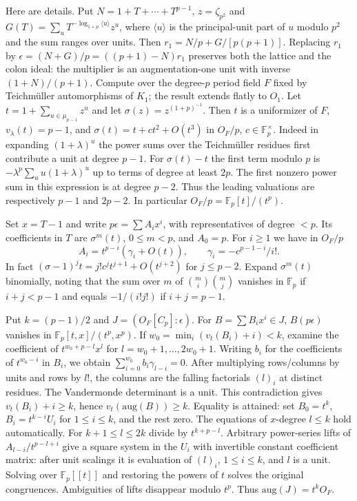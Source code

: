 \documentclass[11pt]{article}
\begin{document}
Here are details. Put $N=1+T+\cdots+T^{p-1}$, $z=\zeta_{p^2}$ and
$G(T)=\sum_u T^{-\log_{1+p}\langle u\rangle}z^u$, where $\langle u\rangle$
is the principal-unit part of $u$ modulo $p^2$ and the sum ranges over
units. Then $r_1=N/p+G/[p(p+1)]$. Replacing $r_1$ by
$\epsilon=(N+G)/p=((p+1)-N)r_1$ preserves both the lattice and the
colon ideal: the multiplier is an augmentation-one unit with inverse
$(1+N)/(p+1)$. Compute over the degree-$p$ period field $F$ fixed by
Teichm\"uller automorphisms of $K_1$; the result extends flatly to $O_1$.
Let $t=1+\sum_{u\in\mu_{p-1}}z^u$ and let $\sigma(z)=z^{(1+p)^{-1}}$.
Then $t$ is a uniformizer of $F$, $v_\lambda(t)=p-1$, and
$\sigma(t)=t+ct^2+O(t^3)$ in $O_F/p$, $c\in\mathbb F_p^\times$.
Indeed in expanding $(1+\lambda)^u$ the power sums over the
Teichm\"uller residues first contribute a unit at degree $p-1$. For
$\sigma(t)-t$ the first term modulo $p$ is
$-\lambda^p\sum_u u(1+\lambda)^u$ up to terms of degree at least $2p$.
The first nonzero power sum in this expression is at degree $p-2$.
Thus the leading valuations are respectively $p-1$ and $2p-2$.
In particular $O_F/p=\mathbb F_p[t]/(t^p)$.

Set $x=T-1$ and write $p\epsilon=\sum A_i x^i$, with representatives
of degree $<p$. Its coefficients in $T$ are $\sigma^m(t)$,
$0\le m<p$, and $A_0=p$. For $i\ge1$ we have in $O_F/p$
\[
 A_i=t^{p-i}(\gamma_i+O(t)),\qquad \gamma_i=-c^{p-1-i}/i!.
\]
In fact $(\sigma-1)^jt=j!c^jt^{j+1}+O(t^{j+2})$ for $j\le p-2$.
Expand $\sigma^m(t)$ binomially, noting that the sum over $m$ of
$\binom mi\binom mj$ vanishes in $\mathbb F_p$ if $i+j<p-1$ and equals
$-1/(i!j!)$ if $i+j=p-1$.

Put $k=(p-1)/2$ and $J=(O_F[C_p]:\epsilon)$. For $B=\sum B_ix^i\in J$,
$B(p\epsilon)$ vanishes in $\mathbb F_p[t,x]/(t^p,x^p)$.
If $w_0=\min_i(v_t(B_i)+i)<k$, examine the coefficient of
$t^{w_0+p-l}x^l$ for $l=w_0+1,\ldots,2w_0+1$. Writing $b_i$ for
the coefficients of $t^{w_0-i}$ in $B_i$, we obtain
$\sum_{i=0}^{w_0} b_i\gamma_{l-i}=0$. After multiplying rows/columns
by units and rows by $l!$, the columns are the falling factorials
$(l)_i$ at distinct residues. The Vandermonde determinant is a unit.
This contradiction gives $v_t(B_i)+i\ge k$, hence $v_t(\mathrm{aug}(B))\ge k$.
Equality is attained: set $B_0=t^k$, $B_i=t^{k-i}U_i$ for $1\le i\le k$,
and the rest zero. The equations of $x$-degree $l\le k$ hold automatically.
For $k+1\le l\le2k$ divide by $t^{k+p-l}$. Arbitrary power-series lifts of
$A_{l-i}/t^{p-l+i}$ give a square system in the $U_i$ with invertible
constant coefficient matrix: after unit scalings it is evaluation of
$(l)_i$, $1\le i\le k$, and $l$ is a unit. Solving over
$\mathbb F_p[[t]]$ and restoring the powers of $t$ solves the original
congruences. Ambiguities of lifts disappear modulo $t^p$. Thus
$\mathrm{aug}(J)=t^k O_F$.
\end{document}
